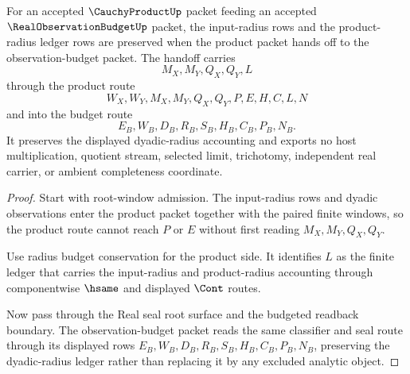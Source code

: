 \begin{theorem}
\label{thm:cauchy-product-dyadic-radius-ledger-handoff}
For an accepted $\CauchyProductUp$ packet feeding an accepted $\RealObservationBudgetUp$ packet, the input-radius rows and the product-radius ledger rows are preserved when the product packet hands off to the observation-budget packet. The handoff carries
$$
M_X,M_Y,Q_X,Q_Y,L
$$
through the product route
$$
W_X,W_Y,M_X,M_Y,Q_X,Q_Y,P,E,H,C,L,N
$$
and into the budget route
$$
E_B,W_B,D_B,R_B,S_B,H_B,C_B,P_B,N_B.
$$
It preserves the displayed dyadic-radius accounting and exports no host multiplication, quotient stream, selected limit, trichotomy, independent real carrier, or ambient completeness coordinate.
\end{theorem}
\begin{proof}
Start with root-window admission. The input-radius rows and dyadic observations enter the product packet together with the paired finite windows, so the product route cannot reach $P$ or $E$ without first reading $M_X,M_Y,Q_X,Q_Y$.

Use radius budget conservation for the product side. It identifies $L$ as the finite ledger that carries the input-radius and product-radius accounting through componentwise $\hsame$ and displayed $\Cont$ routes.

Now pass through the Real seal root surface and the budgeted readback boundary. The observation-budget packet reads the same classifier and seal route through its displayed rows $E_B,W_B,D_B,R_B,S_B,H_B,C_B,P_B,N_B$, preserving the dyadic-radius ledger rather than replacing it by any excluded analytic object.
\end{proof}

